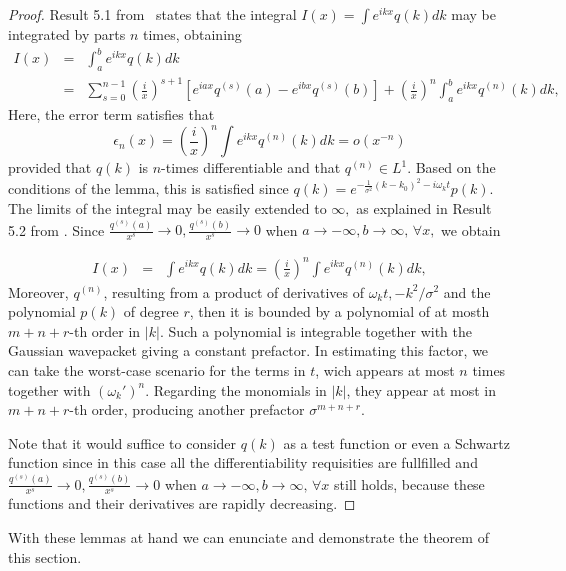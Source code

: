 \documentclass[notitlepage, prx, preprint, amsmath,superscriptaddress,amssymb]{revtex4-1}
\begin{document}
\begin{proof}
Result 5.1 from\ \cite{Olver} states that the integral $I(x) = \int e^{i k x} q(k) dk$ may be integrated by parts $n$ times, obtaining
\begin{eqnarray*}
I(x) &=& \int_a^b e^{i k x} q(k) dk \\
&=&\sum_{s=0}^{n-1} \left(\frac{i}{x}\right)^{s+1} \left[e^{iax} q^{(s)}(a) - e^{ibx} q^{(s)}(b) \right] + \left(\frac{i}{x}\right)^n \int_a^b  e^{ikx} q^{(n)}(k)dk,
\end{eqnarray*} Here, the error term satisfies that
$$ \epsilon_n(x) =  \left(\frac{i}{x}\right)^n\int e^{ikx} q^{(n)}(k)dk = o(x^{-n})$$
provided that $q(k)$ is $n$-times differentiable and that $q^{(n)} \in L^1$. Based on the conditions of the lemma, this is satisfied since $q(k)=e^{- \frac{1}{\sigma^2}{(k-k_0)^2} - i \omega_k t} p(k)$. The limits of the integral may be easily extended to $\infty,$ as explained in Result 5.2 from \cite{Olver}. Since $\frac{q^{(s)}(a)}{x^s} \to 0,  \frac{q^{(s)}(b)}{x^s} \to 0$ when $a\to -\infty, b\to \infty, \, \forall x, $ we obtain

\begin{eqnarray*}
I(x) &=& \int e^{i k x} q(k) dk = \left(\frac{i}{x}\right)^n \int e^{ikx} q^{(n)}(k)dk,
\end{eqnarray*}
Moreover, $q^{(n)}$, resulting from a product of derivatives of $\omega_k t, -k^2/\sigma^2$ and the polynomial $p(k)$ of degree $r$, then it is bounded by a polynomial of at mosth $m+n + r$-th order in $|k|.$ Such a polynomial is integrable together with the Gaussian wavepacket giving a constant prefactor. In estimating this factor, we can take the worst-case scenario for the terms in $t$, wich appears at most $n$ times together with $(\omega_k')^n$. Regarding the monomials in $|k|$, they appear at most in $m+n + r$-th order, producing another prefactor $\sigma^{m+n+ r}$.

Note that it would suffice to consider $q(k)$ as a test function or even a Schwartz function since in this case all the differentiability requisities are fullfilled and  $\frac{q^{(s)}(a)}{x^s} \to 0,  \frac{q^{(s)}(b)}{x^s} \to 0$ when $a\to -\infty, b\to \infty, \, \forall x $ still holds, because these functions and their derivatives are rapidly decreasing.

\end{proof}

With these lemmas at hand we can enunciate and demonstrate the  theorem of this section.
\end{document}
